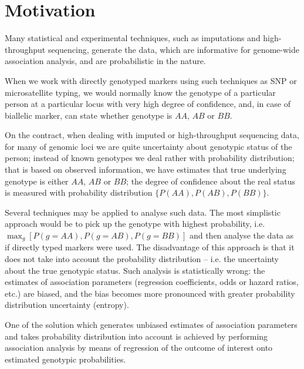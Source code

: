 \documentclass[12pt]{article}
\begin{document}
\maketitle
\tableofcontents


\section{Motivation}

Many statistical and experimental techniques, such as imputations and 
high-throughput sequencing, generate the data, which are informative for 
genome-wide association analysis, and are probabilistic in the nature. 

When we work with directly genotyped markers using such techniques as 
SNP or microsatellite typing, we would normally know the genotype of 
a particular person at a particular locus with very high degree of 
confidence, and, in case of biallelic marker, can state whether 
genotype is $AA$, $AB$ or $BB$. 

On the contract, when dealing with imputed or 
high-throughput sequencing data, for many of genomic loci 
we are quite uncertainty about genotypic status of the person; 
instead of known genotypes  
we deal rather with probability distribution; that is based on 
observed information, we have estimates that true underlying 
genotype is either $AA$, $AB$ or $BB$; the degree of confidence 
about the real status is measured with 
probability distribution $\{P(AA), P(AB), P(BB)\}$.

Several techniques may be applied to analyse such data. The most 
simplistic approach would be to pick up the genotype with highest 
probability, i.e. $\max_g[P(g=AA), P(g=AB), P(g=BB)]$ and then 
analyse the data as if directly typed markers were used. The 
disadvantage of this approach is that it does not take into 
account the probability distribution -- i.e. the uncertainty 
about the true genotypic status. Such 
analysis is statistically wrong: the estimates of association 
parameters (regression coefficients, odds or hazard ratios, etc.) 
are biased, and the bias becomes more pronounced with greater 
probability distribution uncertainty (entropy). 

One of the solution which generates unbiased estimates 
of association parameters and takes 
probability distribution into account is achieved by 
performing association analysis by means of regression of the 
outcome of interest onto estimated genotypic probabilities. 
\end{document}
